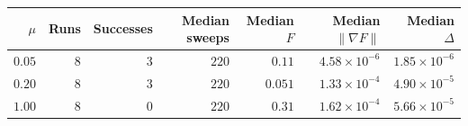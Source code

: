 \begin{tabular}{rrrrrrr}
\toprule
$\mu$ & Runs & Successes & Median sweeps & Median $F$ & Median $\|\nabla F\|$ & Median $\Delta$ \\
\midrule
$0.05$ & 8 & 3 & $220$ & $0.11$ & $4.58\times 10^{-6}$ & $1.85\times 10^{-6}$ \\
$0.20$ & 8 & 3 & $220$ & $0.051$ & $1.33\times 10^{-4}$ & $4.90\times 10^{-5}$ \\
$1.00$ & 8 & 0 & $220$ & $0.31$ & $1.62\times 10^{-4}$ & $5.66\times 10^{-5}$ \\
\bottomrule
\end{tabular}
